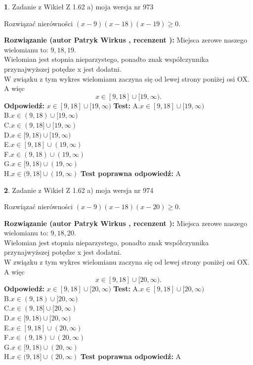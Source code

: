 \documentclass[12pt, a4paper]{article}
\theoremstyle{definition} %
\newtheorem{zad}{}
\newcommand{\zadStart}[1]{\begin{zad}#1\newline}
\newcommand{\zadStop}{\end{zad}}
\newcommand{\rozwStart}[2]{\noindent \textbf{Rozwiązanie (autor #1 , recenzent #2): }\newline}
\newcommand{\rozwStop}{\newline}
\newcommand{\odpStart}{\noindent \textbf{Odpowiedź:}\newline}
\newcommand{\odpStop}{\newline}
\newcommand{\testStart}{\noindent \textbf{Test:}\newline}
\newcommand{\testStop}{\newline}
\newcommand{\kluczStart}{\noindent \textbf{Test poprawna odpowiedź:}\newline}
\newcommand{\kluczStop}{\newline}
\begin{document}
\zadStart{Zadanie z Wikieł Z 1.62 a) moja wersja nr 973}

Rozwiązać nierówności $(x-9)(x-18)(x-19)\ge0$.
\zadStop
\rozwStart{Patryk Wirkus}{}
Miejsca zerowe naszego wielomianu to: $9, 18, 19$.\\
Wielomian jest stopnia nieparzystego, ponadto znak współczynnika przy\linebreak najwyższej potędze x jest dodatni.\\ W związku z tym wykres wielomianu zaczyna się od lewej strony poniżej osi OX. A więc $$x \in [9,18] \cup [19,\infty).$$
\rozwStop
\odpStart
$x \in [9,18] \cup [19,\infty)$
\odpStop
\testStart
A.$x \in [9,18] \cup [19,\infty)$\\
B.$x \in (9,18) \cup [19,\infty)$\\
C.$x \in (9,18] \cup [19,\infty)$\\
D.$x \in [9,18) \cup [19,\infty)$\\
E.$x \in [9,18] \cup (19,\infty)$\\
F.$x \in (9,18) \cup (19,\infty)$\\
G.$x \in [9,18) \cup (19,\infty)$\\
H.$x \in (9,18] \cup (19,\infty)$
\testStop
\kluczStart
A
\kluczStop



\zadStart{Zadanie z Wikieł Z 1.62 a) moja wersja nr 974}

Rozwiązać nierówności $(x-9)(x-18)(x-20)\ge0$.
\zadStop
\rozwStart{Patryk Wirkus}{}
Miejsca zerowe naszego wielomianu to: $9, 18, 20$.\\
Wielomian jest stopnia nieparzystego, ponadto znak współczynnika przy\linebreak najwyższej potędze x jest dodatni.\\ W związku z tym wykres wielomianu zaczyna się od lewej strony poniżej osi OX. A więc $$x \in [9,18] \cup [20,\infty).$$
\rozwStop
\odpStart
$x \in [9,18] \cup [20,\infty)$
\odpStop
\testStart
A.$x \in [9,18] \cup [20,\infty)$\\
B.$x \in (9,18) \cup [20,\infty)$\\
C.$x \in (9,18] \cup [20,\infty)$\\
D.$x \in [9,18) \cup [20,\infty)$\\
E.$x \in [9,18] \cup (20,\infty)$\\
F.$x \in (9,18) \cup (20,\infty)$\\
G.$x \in [9,18) \cup (20,\infty)$\\
H.$x \in (9,18] \cup (20,\infty)$
\testStop
\kluczStart
A
\kluczStop
\end{document}
